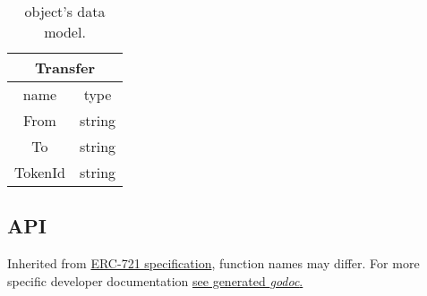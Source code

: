 \begin{center}
  \begin{table}[!ht]
    \centering
    \begin{tabular}{| c | c |}
      \hline
      \multicolumn{2}{|c|}{Transfer} \\
      \hline
      name    & type                 \\
      \hline
      From    & string               \\
      To      & string               \\
      TokenId & string               \\
      \hline
    \end{tabular}
    \caption{ object's data model.}
  \end{table}
\end{center}

\newpage
\subsection{API}
Inherited from \href{https://eips.ethereum.org/EIPS/eip-721}{ERC-721 specification}, function names may differ. For more specific developer documentation \href{https://pkg.go.dev/github.com/perryd01/vaccination-slot/chaincode#section-documentation}{see generated \emph{godoc}.}
